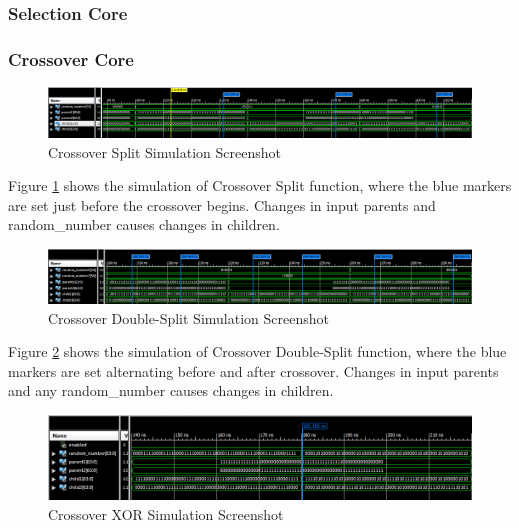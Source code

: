 \subsubsection{Selection Core}
\subsubsection{Crossover Core} 
\begin{figure}[H]
\includegraphics[width=\textwidth]{fpga/fig/testbenches/crossover_split_simulation1.png}
\caption{Crossover Split Simulation Screenshot}
\label{fig_crossover_split_testbench}
\end{figure}

Figure \ref{fig_crossover_split_testbench} shows the simulation of Crossover Split function, where the blue markers are set just before the crossover begins. 
Changes in input parents and random\_number causes changes in children. 

\begin{figure}[H]
\includegraphics[width=\textwidth]{fpga/fig/testbenches/crossover_doublesplit_simulation1.png}
\caption{Crossover Double-Split Simulation Screenshot}
\label{fig_crossover_doublesplit_testbench}
\end{figure}

Figure \ref{fig_crossover_doublesplit_testbench} shows the simulation of Crossover Double-Split function, where the blue markers are set alternating before and after crossover.
Changes in input parents and any random\_number causes changes in children. 

\begin{figure}[H]
\includegraphics[width=\textwidth]{fpga/fig/testbenches/crossover_xor_simulation1.png}
\caption{Crossover XOR Simulation Screenshot}
\label{fig_crossover_xor_testbench}
\end{figure}

